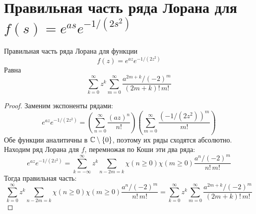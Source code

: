 \section{Правильная часть ряда Лорана для $f(s) = e^{as} e^{-1/(2s^2)}$}
\begin{Th*}
    Правильная часть ряда Лорана для функции
\[
    f(z) = e^{az} e^{-1/(2z^2)}
\]
Равна
\[
    \sum_{k=0}^{\infty} z^k \sum_{m=0}^{\infty} \frac{a^{2m+k} / (-2)^m}{(2m+k)!\,m!}
\]
\end{Th*}
\begin{proof}
Заменим экспоненты рядами:
\[
    e^{az} e^{-1/(2z^2)} =
%
    \left( \sum_{n=0}^{\infty} \frac{(az)^n}{n!} \right)
    \left( \sum_{m=0}^{\infty} \frac{\left( -1 / \left( 2z^2 \right) \right)^m}{m!}  \right) 
\]
Обе функции аналитичны в $\mathbb{C} \setminus \{0\}$, поэтому их ряды сходятся абсолютно. Находим ряд Лорана для $f$, перемножая по Коши эти два ряда:
\[
    e^{az} e^{-1/(2z^2)} =
    \sum_{k=-\infty}^{\infty} z^k \sum_{n-2m=k} \chi(n \ge 0) \chi(m \ge 0) \frac{a^n / (-2)^m}{n!\,m!}
\]
Тогда правильная часть:
\[
    \sum_{k=0}^{\infty} z^k \sum_{n-2m=k} \chi(n \ge 0) \chi(m \ge 0) \frac{a^n / (-2)^m}{n!\,m!} =
    \sum_{k=0}^{\infty} z^k \sum_{m=0}^{\infty} \frac{a^{2m+k} / (-2)^m}{(2m+k)!\,m!}
\]
\end{proof}
